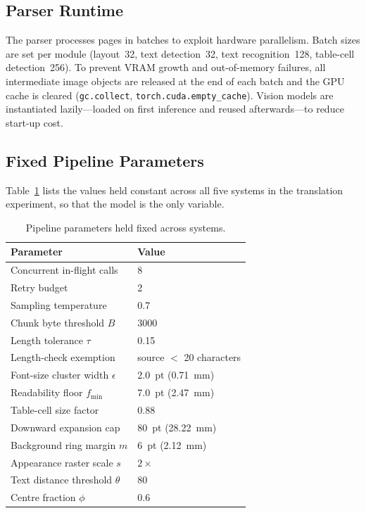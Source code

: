 \subsection{Parser Runtime}
\label{app:parser-runtime}

The parser processes pages in batches to exploit hardware parallelism. Batch
sizes are set per module (layout~32, text detection~32, text recognition~128,
table-cell detection~256). To prevent VRAM growth and out-of-memory failures, all
intermediate image objects are released at the end of each batch and the GPU
cache is cleared (\texttt{gc.collect}, \texttt{torch.cuda.empty\_cache}). Vision
models are instantiated lazily---loaded on first inference and reused
afterwards---to reduce start-up cost.

\subsection{Fixed Pipeline Parameters}

Table~\ref{tab:app-params} lists the values held constant across all five
systems in the translation experiment, so that the model is the only variable.

\begin{table}[H]
\centering
\caption{Pipeline parameters held fixed across systems.}
\label{tab:app-params}
\small
\begin{tabular}{@{}l l@{}}
\toprule
\textbf{Parameter} & \textbf{Value} \\
\midrule
Concurrent in-flight calls   & 8 \\
Retry budget                 & 2 \\
Sampling temperature         & 0.7 \\
Chunk byte threshold $B$     & 3000 \\
Length tolerance $\tau$      & 0.15 \\
Length-check exemption       & source $<$ 20 characters \\
\midrule
Font-size cluster width $\epsilon$ & 2.0~pt (0.71~mm) \\
Readability floor $f_{\min}$       & 7.0~pt (2.47~mm) \\
Table-cell size factor             & 0.88 \\
Downward expansion cap             & 80~pt (28.22~mm) \\
\midrule
Background ring margin $m$   & 6~pt (2.12~mm) \\
Appearance raster scale $s$  & $2\times$ \\
Text distance threshold $\theta$ & 80 \\
Centre fraction $\phi$       & 0.6 \\
\bottomrule
\end{tabular}
\end{table}

